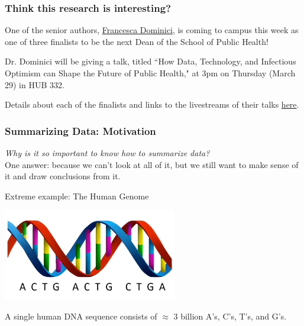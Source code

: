 \documentclass[12pt, 
hyperref={colorlinks=true, linkcolor=blue, urlcolor=cyan}]{beamer}
\begin{document}
\begin{frame}
\frametitle{Think this research is interesting?}

One of the senior authors, \href{https://sites.sph.harvard.edu/francesca-dominici/}{Francesca Dominici}, is coming to campus this week as one of three finalists to be the next Dean of the School of Public Health!

Dr. Dominici will be giving a talk, titled ``How Data, Technology, and Infectious Optimism can Shape the Future of Public Health," at 3pm on Thursday (March 29) in HUB 332.

Details about each of the finalists and links to the livestreams of their talks \href{http://www.washington.edu/provost/leadership-searches/deanship-of-the-school-of-public-health/}{here}.
\end{frame}

\begin{frame} 
\frametitle{Summarizing Data: Motivation}
\textit{Why is it so important to know how to summarize data?} \\ One answer: because we can't look at all of it, but we still want to make sense of it and draw conclusions from it.

\color{blue} Extreme example: \color{black} The Human Genome
\vspace{-0.4cm} \begin{center} \includegraphics[height=4cm]{./dna} \end{center}
\vspace{-0.8cm} \begin{scriptsize} A single human DNA sequence consists of $\approx$ 3 billion A's, C's, T's, and G's. \end{scriptsize}
\end{frame}
\end{document}
